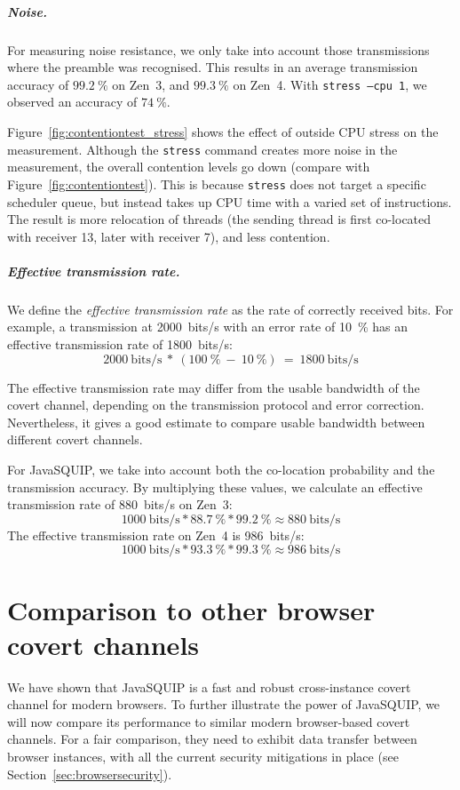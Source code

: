 \documentclass[11pt,
  titlepage=false,
  parskip=half,      %
]{scrreprt}
\begin{document}
\paragraph{Noise.}
For measuring noise resistance, we only take into account those transmissions where the preamble was recognised.
This results in an average transmission accuracy of $99.2~\%$ on Zen~3, and $99.3~\%$ on Zen~4.
With \texttt{stress --cpu 1}, we observed an accuracy of $74~\%$.

Figure~\ref{fig:contentiontest_stress} shows the effect of outside CPU stress on the measurement.
Although the \texttt{stress} command creates more noise in the measurement, the overall contention levels go down (compare with Figure~\ref{fig:contentiontest}).
This is because \texttt{stress} does not target a specific scheduler queue, but instead takes up CPU time with a varied set of instructions.
The result is more relocation of threads (the sending thread is first co-located with receiver 13, later with receiver 7), and less contention.

\paragraph{Effective transmission rate.}
We define the \textit{effective transmission rate} as the rate of correctly received bits.
For example, a transmission at 2000~bits/s with an error rate of 10~\%
has an effective transmission rate of 1800~bits/s:
\[2000~\text{bits/s}~*~(100~\%~-~10~\%)~=~1800~\text{bits/s}\]

The effective transmission rate may differ from the usable bandwidth of the covert channel,
depending on the transmission protocol and error correction.
Nevertheless, it gives a good estimate to compare usable bandwidth between different covert channels.

For JavaSQUIP, we take into account both the co-location probability and the transmission accuracy.
By multiplying these values, we calculate an effective transmission rate of 880~bits/s on Zen~3:
\[1000~\text{bits/s} * 88.7~\% * 99.2~\% \approx 880~\text{bits/s}\]
The effective transmission rate on Zen~4 is 986~bits/s:
\[1000~\text{bits/s} * 93.3~\% * 99.3~\% \approx 986~\text{bits/s}\]

\chapter{Comparison to other browser covert channels}
\label{ch:comparison}
We have shown that JavaSQUIP is a fast and robust cross-instance covert channel for modern browsers.
To further illustrate the power of JavaSQUIP,
we will now compare its performance to similar modern browser-based covert channels.
For a fair comparison, they need to exhibit data transfer between browser instances,
with all the current security mitigations in place (see Section~\ref{sec:browsersecurity}).
\end{document}
